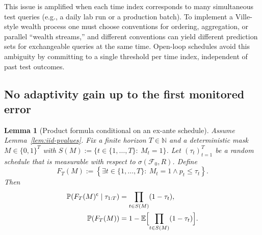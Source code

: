 \documentclass{uai2026} %
\newtheorem{lemma}{Lemma}
\newcommand{\N}{\mathbb{N}}
\newcommand{\1}{\mathbf{1}}
\newcommand{\prob}{\mathbb{P}}
\newcommand{\expec}{\mathbb{E}}
\newcommand{\F}{\mathcal{F}}
\begin{document}
This issue is amplified when each time index corresponds to many simultaneous test queries (e.g., a daily lab run or a production batch).
To implement a Ville-style wealth process one must choose conventions for ordering, aggregation, or parallel ``wealth streams,'' and different conventions can yield different prediction sets for exchangeable queries at the same time.
Open-loop schedules avoid this ambiguity by committing to a single threshold per time index, independent of past test outcomes.

\subsection{No adaptivity gain up to the first monitored error}
\label{sec:no-adaptivity}

\begin{lemma}[Product formula conditional on an ex-ante schedule]
  \label{lem:product-given-schedule}
  Assume Lemma~\ref{lem:iid-pvalues}.
  Fix a finite horizon $T\in\N$ and a deterministic mask $M\in\{0,1\}^{T}$ with $S(M):=\{t\in\{1,\dots,T\}:\ M_{t}=1\}$.
  Let $(\tau_{t})_{t=1}^{T}$ be a random schedule that is measurable with respect to $\sigma(\F_{0},R)$.
  Define
  \begin{equation*}
    F_{T}(M):=\left\{\exists t\in\{1,\dots,T\}:\ M_{t}=1 \wedge p_{t}\le \tau_{t}\right\}.
  \end{equation*}
  Then
  \begin{equation*}
    \begin{aligned}
      \prob(F_{T}(M)^{\mathsf{c}}\mid \tau_{1:T})&=\prod_{t\in S(M)}(1-\tau_{t}),\\
      \prob(F_{T}(M))&=1-\expec\Bigl[\prod_{t\in S(M)}(1-\tau_{t})\Bigr].
    \end{aligned}
  \end{equation*}
\end{lemma}
\end{document}
